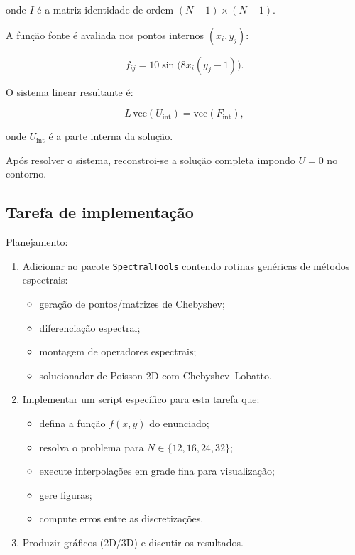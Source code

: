 \documentclass[12pt,a4paper]{article}
\begin{document}
onde $I$ é a matriz identidade de ordem $(N-1)\times(N-1)$.

A função fonte é avaliada nos pontos internos $(x_i, y_j)$:

\[
f_{ij} = 10 \sin\!\big( 8 x_i (y_j - 1) \big).
\]

O sistema linear resultante é:

\[
L\,\mathrm{vec}(U_{\text{int}}) = \mathrm{vec}(F_{\text{int}}),
\]

onde $U_{\text{int}}$ é a parte interna da solução.

Após resolver o sistema, reconstroi-se a solução completa impondo $U=0$ no contorno.

\subsection{Tarefa de implementação}

Planejamento:

\begin{enumerate}
    \item Adicionar ao pacote \texttt{SpectralTools} contendo rotinas genéricas de métodos espectrais:
    \begin{itemize}
        \item geração de pontos/matrizes de Chebyshev;
        \item diferenciação espectral;
        \item montagem de operadores espectrais;
        \item solucionador de Poisson 2D com Chebyshev--Lobatto.
    \end{itemize}
    
    \item Implementar um script específico para esta tarefa que:
    \begin{itemize}
        \item defina a função $f(x,y)$ do enunciado;
        \item resolva o problema para $N\in\{12,16,24,32\}$;
        \item execute interpolações em grade fina para visualização;
        \item gere figuras;
        \item compute erros entre as discretizações.
    \end{itemize}

    \item Produzir gráficos (2D/3D) e discutir os resultados.

\end{enumerate}
\end{document}
